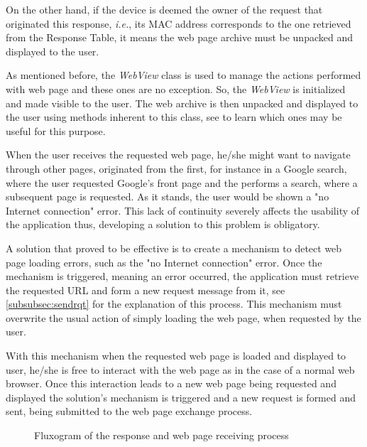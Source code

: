 On the other hand, if the device is deemed the owner of the request that originated this response, \textit{i.e.}, its \gls{MAC} address corresponds to the one retrieved from the Response Table, it means the web page archive must be unpacked and displayed to the user.

As mentioned before, the \textit{WebView} class is used to manage the actions performed with web page and these ones are no exception. So, the \textit{WebView} is initialized and made visible to the user. The web archive is then unpacked and displayed to the user using methods inherent to this class, see \cite{webview} to learn which ones may be useful for this purpose.

When the user receives the requested web page, he/she might want to navigate through other pages, originated from the first, for instance in a Google search, where the user requested Google's front page and the performs a search, where a subsequent page is requested. As it stands, the user would be shown a "no Internet connection" error. This lack of continuity severely affects the usability of the application thus, developing a solution to this problem is obligatory.

A solution that proved to be effective is to create a mechanism to detect web page loading errors, such as the "no Internet connection" error. Once the mechanism is triggered, meaning an error occurred, the application must retrieve the requested \gls{URL} and form a new request message from it, see \ref{subsubsec:sendrqt} for the explanation of this process. This mechanism must overwrite the usual action of simply loading the web page, when requested by the user.

With this mechanism when the requested web page is loaded and displayed to user, he/she is free to interact with the web page as in the case of a normal web browser. Once this interaction leads to a new web page being requested and displayed the solution's mechanism is triggered and a new request is formed and sent, being submitted to the web page exchange process.

\begin{figure}[ht]
   \noindent{}
	\caption{\label{fig:rsprcvflux} Fluxogram of the response and web page receiving process}
\end{figure}

